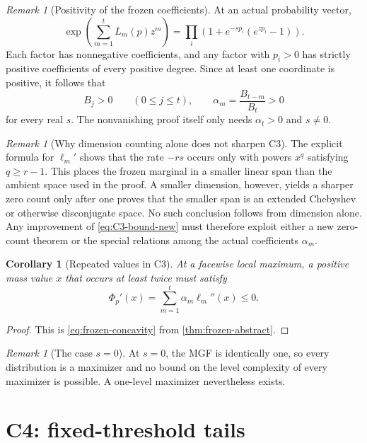 \documentclass[11pt]{article}
\theoremstyle{plain}
\newtheorem{corollary}[theorem]{Corollary}
\theoremstyle{definition}
\theoremstyle{remark}
\newtheorem{remark}[theorem]{Remark}
\begin{document}
\begin{remark}[Positivity of the frozen coefficients]
At an actual probability vector,
\[
\exp\left(\sum_{m=1}^tL_m(p)z^m\right)
=\prod_i\left(1+e^{-sp_i}(e^{zp_i}-1)\right).
\]
Each factor has nonnegative coefficients, and any factor with \(p_i>0\) has strictly positive coefficients of every positive degree.  Since at least one coordinate is positive, it follows that
\[
B_j>0
\qquad(0\le j\le t),
\qquad
\alpha_m=\frac{B_{t-m}}{B_t}>0
\]
for every real \(s\).  The nonvanishing proof itself only needs \(\alpha_t>0\) and \(s\ne0\).
\end{remark}

\begin{remark}[Why dimension counting alone does not sharpen C3]
The explicit formula for \(\ell_m'\) shows that the rate \(-rs\) occurs only with powers \(x^q\) satisfying \(q\ge r-1\).  This places the frozen marginal in a smaller linear span than the ambient space used in the proof.  A smaller dimension, however, yields a sharper zero count only after one proves that the smaller span is an extended Chebyshev or otherwise disconjugate space.  No such conclusion follows from dimension alone.  Any improvement of \eqref{eq:C3-bound-new} must therefore exploit either a new zero-count theorem or the special relations among the actual coefficients \(\alpha_m\).
\end{remark}

\begin{corollary}[Repeated values in C3]\label{cor:C3-repeated}
At a facewise local maximum, a positive mass value \(x\) that occurs at least twice must satisfy
\[
\Phi_p'(x)=\sum_{m=1}^t\alpha_m\ell_m''(x)\le0.
\]
\end{corollary}

\begin{proof}
This is \eqref{eq:frozen-concavity} from \cref{thm:frozen-abstract}.
\end{proof}

\begin{remark}[The case \(s=0\)]
At \(s=0\), the MGF is identically one, so every distribution is a maximizer and no bound on the level complexity of every maximizer is possible.  A one-level maximizer nevertheless exists.
\end{remark}

\section{C4: fixed-threshold tails}
\end{document}
